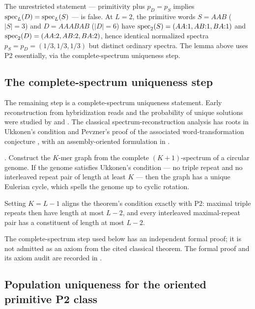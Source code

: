 \begin{remark}
The unrestricted statement --- primitivity plus $p_D=p_S$ implies
$\operatorname{spec}_L(D)=\operatorname{spec}_L(S)$ --- is false. At $L=2$, the primitive words
$S=AAB$ ($|S|=3$) and $D=AAABAB$ ($|D|=6$) have
$\operatorname{spec}_2(S)=(AA{:}1,AB{:}1,BA{:}1)$ and
$\operatorname{spec}_2(D)=(AA{:}2,AB{:}2,BA{:}2)$, hence identical normalized spectra
$p_S=p_D=(1/3,1/3,1/3)$ but distinct ordinary spectra. The lemma above
uses P2 essentially, via the complete-spectrum uniqueness step.
\end{remark}

\subsection{The complete-spectrum uniqueness step}

The remaining step is a complete-spectrum uniqueness statement.
Early reconstruction from hybridization reads and the
probability of unique solutions were studied by
\textcite{pevzner1989} and \textcite{dyer1994}.
The classical spectrum-reconstruction analysis has roots in Ukkonen's
condition and Pevzner's proof of the associated word-transformation
conjecture \parencite{ukkonen1992,pevzner1995}, with an assembly-oriented
formulation in \parencite{bresler2013}.

\begin{theorem}
\label{thm:BBT}
\srcfact{} \parencite{ukkonen1992,pevzner1995,bresler2013}. Construct the $K$-mer graph from the complete
$(K+1)$-spectrum of a circular genome. If the genome satisfies Ukkonen's
condition --- no triple repeat and no interleaved repeat pair of length at least
$K$ --- then the graph has a unique Eulerian cycle, which spells the genome up
to cyclic rotation.
\end{theorem}

Setting $K=L-1$ aligns the theorem's condition exactly with P2: maximal triple
repeats then have length at most $L-2$, and every interleaved maximal-repeat pair
has a constituent of length at most $L-2$.

The complete-spectrum step used below has an independent
formal proof; it is not admitted as an axiom from the cited classical
theorem. The formal proof and its axiom audit are recorded in
.


\subsection{Population uniqueness for the oriented primitive P2 class}

